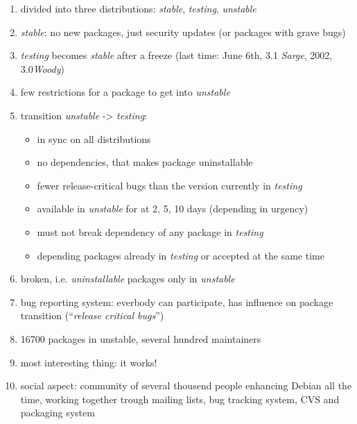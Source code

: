 \begin{enumerate}
\item divided into three distributions: \emph{stable}, \emph{testing}, \emph{unstable}
\item \emph{stable}: no new packages, just security updates (or packages with grave bugs)
\item \emph{testing} becomes \emph{stable} after a freeze (last time: June 6th, 3.1 \emph{Sarge}, 2002, 3.0\emph{Woody})
\item few restrictions for a package to get into \emph{unstable}
\item transition \emph{unstable} -> \emph{testing}: 
\begin{itemize}
\item in sync on all distributions
\item no dependencies, that makes package uninstallable
\item fewer release-critical bugs than the version currently in \emph{testing}
\item available in \emph{unstable} for at 2, 5, 10 days (depending in urgency)
\item must not break dependency of any package in \emph{testing}
\item depending packages already in \emph{testing} or accepted at the same time
\end{itemize}
\item broken, i.e. \emph{uninstallable} packages only in \emph{unstable}
\item bug reporting system: everbody can participate, has influence on package transition (``\emph{release critical bugs}'')
\item 16700 packages in unstable, several hundred maintainers
\item most interesting thing: it works!
\item social aspect: community of several thousend people enhancing Debian all the time, working together
trough mailing lists, bug tracking system, CVS and packaging system
\end{enumerate}


